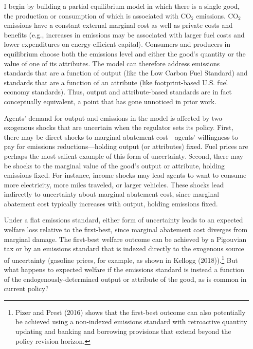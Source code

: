 \documentclass[12pt]{article}
\begin{document}
I begin by building a partial equilibrium model in which there is a single good, the production or consumption of which is associated with CO$_{\text{2}}$ emissions. CO$_{\text{2}}$ emissions have a constant external marginal cost as well as private costs and benefits (e.g., increases in emissions may be associated with larger fuel costs and lower expenditures on energy-efficient capital). Consumers and producers in equilibrium choose both the emissions level and either the good's quantity or the value of one of its attributes. The model can therefore address emissions standards that are a function of output (like the Low Carbon Fuel Standard) and standards that are a function of an attribute (like footprint-based U.S. fuel economy standards). Thus, output and attribute-based standards are in fact conceptually equivalent, a point that has gone unnoticed in prior work.

Agents' demand for output and emissions in the model is affected by two exogenous shocks that are uncertain when the regulator sets its policy. First, there may be direct shocks to marginal abatement cost---agents' willingness to pay for emissions reductions---holding output (or attributes) fixed. Fuel prices are perhaps the most salient example of this form of uncertainty. Second, there may be shocks to the marginal value of the good's output or attribute, holding emissions fixed. For instance, income shocks may lead agents to want to consume more electricity, more miles traveled, or larger vehicles. These shocks lead indirectly to uncertainty about marginal abatement cost, since marginal abatement cost typically increases with output, holding emissions fixed.

Under a flat emissions standard, either form of uncertainty leads to an expected welfare loss relative to the first-best, since marginal abatement cost diverges from marginal damage. The first-best welfare outcome can be achieved by a Pigouvian tax or by an emissions standard that is indexed directly to the exogenous source of uncertainty (gasoline prices, for example, as shown in Kellogg (2018)).\footnote{Pizer and Prest (2016) shows that the first-best outcome can also potentially be achieved using a non-indexed emissions standard with retroactive quantity updating and banking and borrowing provisions that extend beyond the policy revision horizon.} But what happens to expected welfare if the emissions standard is instead a function of the endogenously-determined output or attribute of the good, as is common in current policy?
\end{document}
